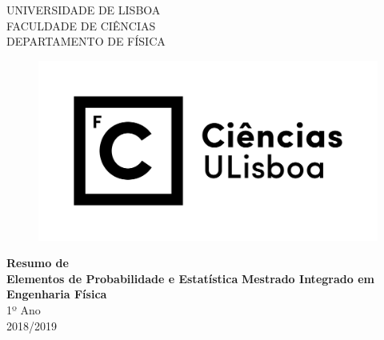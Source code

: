 \begin{titlepage}
    \centering
    \Large UNIVERSIDADE DE LISBOA\\
    \Large FACULDADE DE CIÊNCIAS\\
    \Large DEPARTAMENTO DE FÍSICA\\
    \vfill
    \begin{figure}[ht!]
        \centering
        \includegraphics[scale=0.5]{fcul.png}
    \end{figure}
    \vfill
    \textbf{\LARGE Resumo de\\Elementos de Probabilidade e Estatística}
    \vfill
    \vfill
    \textbf{\Large Mestrado Integrado em Engenharia Física}\\
    \vspace{0.5cm}
    \Large 1º Ano\\
    \vspace{0.5cm}
    \vfill
    \vfill
    \Large 2018/2019
\end{titlepage}